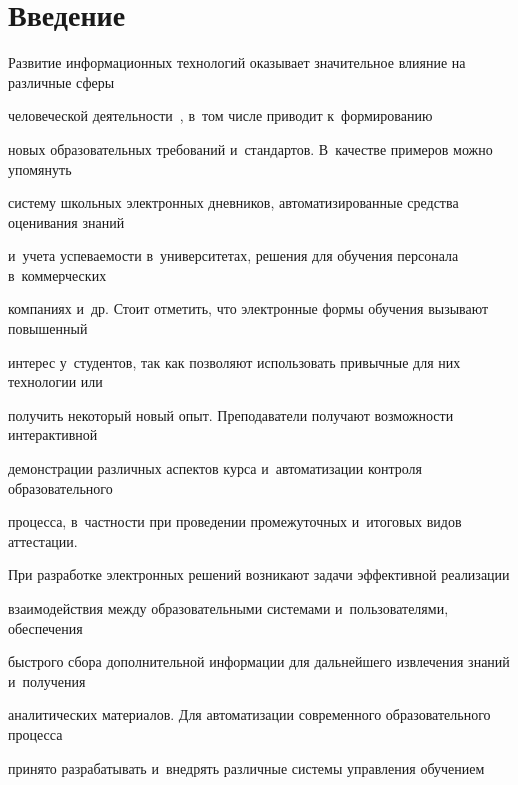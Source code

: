       \thispagestyle{headings}


      







\section{Введение}





Развитие информационных технологий оказывает значительное влияние на различные сферы 


человеческой деятельности~\cite{Gorshenin2016a}, в~том числе приводит к~формированию 


новых образовательных требований и~стандартов. В~качестве примеров можно упомянуть 


систему школьных электронных дневников, автоматизированные средства оценивания знаний 


и~учета успеваемости в~университетах, решения для обучения персонала в~коммерческих 


компаниях и~др. Стоит отметить, что электронные формы обучения вызывают повышенный 


интерес у~студентов, так как позволяют использовать привычные для них технологии или 


получить некоторый новый опыт. Преподаватели получают возможности интерактивной 


демонстрации различных аспектов курса и~автоматизации контроля образовательного 


процесса, в~частности при проведении промежуточных и~итоговых видов аттестации.





При разработке электронных решений возникают задачи эффективной реализации 


взаимодействия между образовательными системами и~пользователями, обеспечения 


быстрого сбора дополнительной информации для дальнейшего извлечения знаний и~получения 


аналитических материалов. Для автоматизации современного образовательного процесса 


принято разрабатывать и~внедрять различные системы управления обучением 


